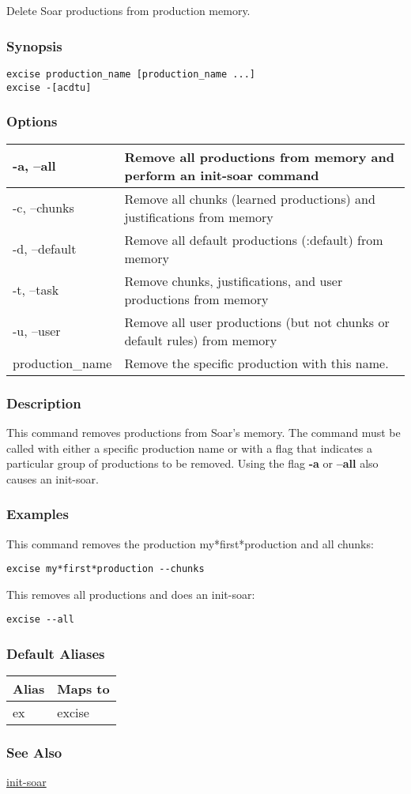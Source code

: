 \subsection{}
\label{excise}
Delete Soar productions from production memory. 
\subsubsection*{Synopsis}
  \begin{verbatim}
excise production_name [production_name ...]
excise -[acdtu]
\end{verbatim}
\subsubsection*{Options}
\begin{tabular}{|l|l|}
\hline 
 -a, --all  & Remove all productions from memory and perform an init-soar command  \\
 \hline 
 -c, --chunks  & Remove all chunks (learned productions) and justifications from memory  \\
 \hline 
 -d, --default  & Remove all default productions (:default) from memory  \\
 \hline 
 -t, --task  & Remove chunks, justifications, and user productions from memory  \\
 \hline 
 -u, --user  & Remove all user productions (but not chunks or default rules) from memory  \\
 \hline 
production\_name & Remove the specific production with this name.  \\
 \hline 
\end{tabular}
\subsubsection*{Description}
 This command removes productions from Soar's memory. The command must be called with either a specific production name or with a flag that indicates a particular group of productions to be removed. Using the flag \textbf{-a}
 or \textbf{--all}
 also causes an init-soar. 
\subsubsection*{Examples}
 This command removes the production my*first*production and all chunks: \begin{verbatim}
excise my*first*production --chunks
\end{verbatim}
 This removes all productions and does an init-soar: \begin{verbatim}
excise --all
\end{verbatim}
\subsubsection*{Default Aliases}
\begin{tabular}{|l|l|}
\hline 
 Alias  & Maps to  \\
 \hline 
 ex  & excise  \\
 \hline 
\end{tabular}
\subsubsection*{See Also}
\hyperref[init-soar]{init-soar} 